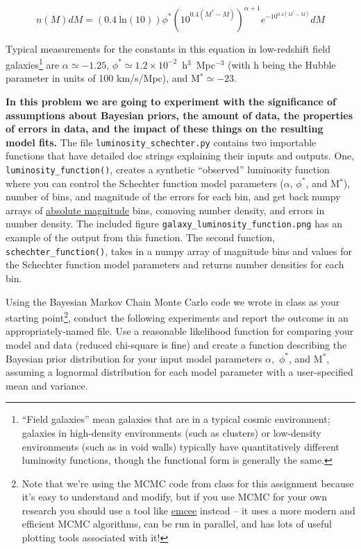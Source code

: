 \documentclass[10pt]{article}
\begin{document}
\begin{equation}
n(M)dM = (0.4~\mathrm{ln}(10))\phi^* (10^{0.4(M^*-M)})^{\alpha+1}e^{-10^{0.4(M^*-M)}}dM
\end{equation}

Typical measurements for the constants in this equation in
low-redshift field galaxies\footnote{``Field galaxies'' mean galaxies
that are in a typical cosmic environment; galaxies in high-density
environments (such as clusters) or low-density environments (such as
in void walls) typically have quantitatively different luminosity functions, though the
functional form is generally the same.} are $\alpha\simeq-1.25$,
$\phi^*\simeq1.2\times10^{-2}$~h$^3$~Mpc$^{-3}$ (with h being the Hubble
parameter in units of 100 km/s/Mpc), and M$^* \simeq -23$.

\textbf{In this problem we are going to experiment with the significance of
assumptions about Bayesian priors, the amount of data, the properties
of errors in data,
and the impact of these things on the resulting model fits.}  The file
\texttt{luminosity\_schechter.py} contains two importable functions
that have detailed doc strings explaining their inputs and outputs.
One, \texttt{luminosity\_function()}, creates a synthetic ``observed''
luminosity function where you can control the Schechter function model
parameters ($\alpha$, $\phi^*$, and M$^*$), number of bins, and
magnitude of the errors for each bin, and get back numpy arrays of
\href{https://en.wikipedia.org/wiki/Absolute_magnitude}{absolute
  magnitude} bins,
comoving number density, and errors in number density.  The included
figure \texttt{galaxy\_luminosity\_function.png} has an example of the
output from this function. The second function,
\texttt{schechter\_function()}, takes in a numpy array of magnitude
bins and values for the Schechter function model parameters and
returns number densities for each bin.

Using the Bayesian Markov Chain Monte Carlo code we wrote in class as
your starting point\footnote{Note that we're using the MCMC code from
  class for this assignment because it's easy to understand and modify, but if you use MCMC for your own research
you should use a tool like
\href{https://emcee.readthedocs.io/en/stable/}{emcee} instead -- it
uses a more modern and efficient MCMC algorithms, can be run in
parallel, and has lots of useful plotting tools associated with it!}, conduct the following experiments and report the
outcome in an appropriately-named file.  Use a reasonable likelihood
function for comparing your model and data (reduced chi-square is
fine) and create a function describing the Bayesian prior distribution
for your input model parameters $\alpha$,~$\phi^*$, and M$^*$,
assuming a lognormal distribution for each model parameter with a
user-specified mean and variance.
\end{document}
